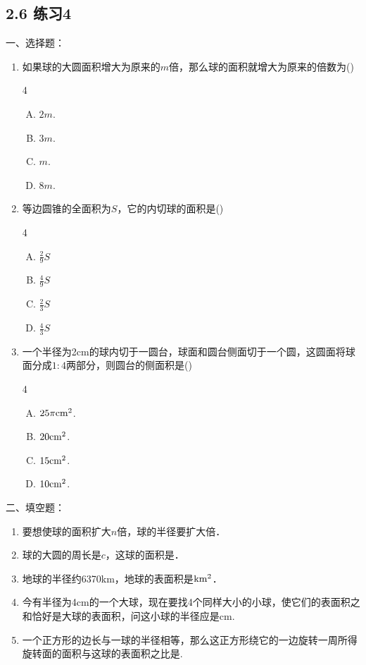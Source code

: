 \subsection*{2.6 练习4}
一、选择题：
\begin{enumerate}
    \item 如果球的大圆面积增大为原来的$m$倍，那么球的面积就增大为原来的倍数为\hfill (\qquad)
\begin{multicols}{4}
\begin{enumerate}[(A)]
\item $2m$.
\item $3m$.
\item $m$.
\item $8m$.
\end{enumerate}
\end{multicols}

\item 等边圆锥的全面积为$S$，它的内切球的面积是\hfill (\qquad)
\begin{multicols}{4}
 \begin{enumerate}[(A)]
    \item $\frac{2}{9}S$
    \item $\frac{4}{9}S$
    \item $\frac{2}{3}S$
    \item $\frac{4}{3}S$
\end{enumerate}   
\end{multicols}
\item 一个半径为2cm的球内切于一圆台，球面和圆台侧面切于一个圆，这圆面将球面分成$1:4$两部分，则圆台的侧面积是\hfill (\qquad)
\begin{multicols}{4}
\begin{enumerate}[(A)]
\item $25\pi{\rm cm}^2$.
\item $20{\rm cm}^2$.
\item $15{\rm cm}^2$.
\item $10{\rm cm}^2$.
\end{enumerate}
\end{multicols}
\end{enumerate}

二、填空题：
\begin{enumerate}
 \item 要想使球的面积扩大$n$倍，球的半径要扩大\blank 倍．
\item 球的大圆的周长是$c$，这球的面积是\blank ．
\item 地球的半径约6370km，地球的表面积是\blank ${\rm km^2}$．
\item 今有半径为4cm的一个大球，现在要找4个同样大小的小球，使它们的表面积之和恰好是大球的表面积，问这小球的半径应是\blank cm.
\item 一个正方形的边长与一球的半径相等，那么这正方形绕它的一边旋转一周所得旋转面的面积与这球的表面积之比是\blank. 
\end{enumerate}



